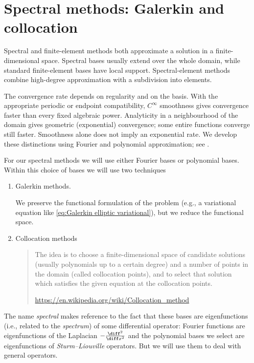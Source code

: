 \chapter{Spectral methods: Galerkin and collocation}

Spectral and finite-element methods both approximate a solution in a finite-dimensional space. Spectral bases usually extend over the whole domain, while standard finite-element bases have local support. Spectral-element methods combine high-degree approximation with a subdivision into elements.

The convergence rate depends on regularity and on the basis. With the appropriate periodic or endpoint compatibility, $C^\infty$ smoothness gives convergence faster than every fixed algebraic power. Analyticity in a neighbourhood of the domain gives geometric (exponential) convergence; some entire functions converge still faster. Smoothness alone does not imply an exponential rate. We develop these distinctions using Fourier and polynomial approximation; see \cite{CanutoHussainiQuarteroniZang2011}.

For our spectral methods we will use either Fourier bases or polynomial bases.
Within this choice of bases we will use two techniques
\begin{enumerate}
    \item Galerkin methods.

          We preserve the functional formulation of the problem (e.g., a variational equation like \eqref{eq:Galerkin elliptic variational}), but we reduce the functional space.

    \item Collocation methods

          \begin{quote}
              The idea is to choose a finite-dimensional space of candidate solutions (usually polynomials up to a certain degree) and a number of points in the domain (called collocation points), and to select that solution which satisfies the given equation at the collocation points.

              \url{https://en.wikipedia.org/wiki/Collocation_method}
          \end{quote}
\end{enumerate}

\begin{remark}
    The name \emph{spectral} makes reference to the fact that these bases are eigenfunctions (i.e., related to the \emph{spectrum}) of some differential operator: Fourier functions are eigenfunctions of the Laplacian $-\frac{\diff^2}{\diff x^2}$ and the polynomial bases we select are eigenfunctions of \emph{Sturm--Liouville} operators. But we will use them to deal with general operators.
\end{remark}


